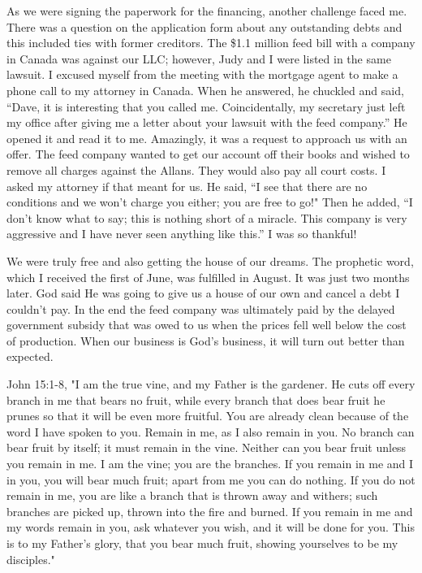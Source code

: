 \documentclass[twoside, 12pt]{book}
\begin{document}
As we were signing the paperwork for the financing, another challenge faced me. There was a question on the application form about any outstanding debts and this included ties with former creditors. The \$1.1 million feed bill with a company in Canada was against our LLC; however, Judy and I were listed in the same lawsuit. I excused myself from the meeting with the mortgage agent to make a phone call to my attorney in Canada. When he answered, he chuckled and said, “Dave, it is interesting that you called me. Coincidentally, my secretary just left my office after giving me a letter about your lawsuit with the feed company.” He opened it and read it to me. Amazingly, it was a request to approach us with an offer. The feed company wanted to get our account off their books and wished to remove all charges against the Allans. They would also pay all court costs. I asked my attorney if that meant for us. He said,  “I see that there are no conditions and we won’t charge you either; you are free to go!" Then he added, “I don't know what to say; this is nothing short of a miracle. This company is very aggressive and I have never seen anything like this.” I was so thankful!

We were truly free and also getting the house of our dreams. The prophetic word, which I received the first of June, was fulfilled in August. It was just two months later. God said He was going to give us a house of our own and cancel a debt I couldn't pay. In the end the feed company was ultimately paid by the delayed government subsidy that was owed to us when the prices fell well below the cost of production. When our business is God’s business, it will turn out better than expected. 

John 15:1-8,  "I am the true vine, and my Father is the gardener. He cuts off every branch in me that bears no fruit, while every branch that does bear fruit he prunes so that it will be even more fruitful. You are already clean because of the word I have spoken to you. Remain in me, as I also remain in you. No branch can bear fruit by itself; it must remain in the vine. Neither can you bear fruit unless you remain in me. I am the vine; you are the branches. If you remain in me and I in you, you will bear much fruit; apart from me you can do nothing. If you do not remain in me, you are like a branch that is thrown away and withers; such branches are picked up, thrown into the fire and burned. If you remain in me and my words remain in you, ask whatever you wish, and it will be done for you. This is to my Father’s glory, that you bear much fruit, showing yourselves to be my disciples."
\end{document}
